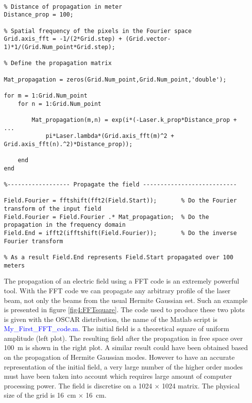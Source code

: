 
\begin{lstlisting}[float=tp,caption=The code used to propagate the matrix Field.Start \label{lis1:start2},frame=lines]

% Distance of propagation in meter
Distance_prop = 100;

% Spatial frequency of the pixels in the Fourier space
Grid.axis_fft = -1/(2*Grid.step) + (Grid.vector-1)*1/(Grid.Num_point*Grid.step);

% Define the propagation matrix

Mat_propagation = zeros(Grid.Num_point,Grid.Num_point,'double');

for m = 1:Grid.Num_point
    for n = 1:Grid.Num_point

        Mat_propagation(m,n) = exp(i*(-Laser.k_prop*Distance_prop + ...
            pi*Laser.lambda*(Grid.axis_fft(m)^2 + Grid.axis_fft(n).^2)*Distance_prop));

    end
end

%------------------ Propagate the field ---------------------------

Field.Fourier = fftshift(fft2(Field.Start));       % Do the Fourier transform of the input field
Field.Fourier = Field.Fourier .* Mat_propagation;  % Do the propagation in the frequency domain
Field.End = ifft2(ifftshift(Field.Fourier));       % Do the inverse Fourier transform

% As a result Field.End represents Field.Start propagated over 100 meters
\end{lstlisting}


The propagation of an electric field using a FFT code is an extremely powerful tool. With the FFT code we can propagate any arbitrary profile of the laser beam, not only the beams from the usual Hermite Gaussian set. Such an example is presented in figure \ref{fig4:FFTsquare}. The code used to produce these two plots is given with the OSCAR distribution, the name of the Matlab script is \textcolor{blue}{My\_First\_FFT\_code.m}. The initial field is a theoretical square of uniform amplitude (left plot). The resulting field after the propagation in free space over 100~m is shown in the right plot. A similar result could have been obtained based on the propagation of Hermite Gaussian modes. However to have an accurate representation of the initial field, a very large number of the higher order modes must have been taken into account which requires large amount of computer processing power. The field is discretise on a 1024 $\times$ 1024 matrix. The physical size of the grid is 16~cm $\times$ 16~cm.\\


